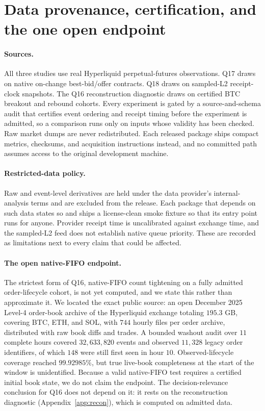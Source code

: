 \section{Data provenance, certification, and the one open endpoint}
\label{app:data}

\paragraph{Sources.} All three studies use real Hyperliquid perpetual-futures observations.
Q17 draws on native on-change best-bid/offer contracts. Q18 draws on sampled-L2 receipt-clock
snapshots. The Q16 reconstruction diagnostic draws on certified BTC breakout and rebound
cohorts. Every experiment is gated by a source-and-schema audit that certifies event ordering
and receipt timing before the experiment is admitted, so a comparison runs only on inputs
whose validity has been checked. Raw market dumps are never redistributed. Each released
package ships compact metrics, checksums, and acquisition instructions instead, and no
committed path assumes access to the original development machine.

\paragraph{Restricted-data policy.} Raw and event-level derivatives are held under the data
provider's internal-analysis terms and are excluded from the release. Each package that
depends on such data states so and ships a license-clean smoke fixture so that its entry
point runs for anyone. Provider receipt time is uncalibrated against exchange time, and the
sampled-L2 feed does not establish native queue priority. These are recorded as limitations
next to every claim that could be affected.

\paragraph{The open native-FIFO endpoint.} The strictest form of Q16, native-FIFO count
tightening on a fully admitted order-lifecycle cohort, is not yet computed, and we state
this rather than approximate it. We located the exact public source: an open December 2025
Level-4 order-book archive of the Hyperliquid exchange totaling $195.3$ GB, covering BTC,
ETH, and SOL, with $744$ hourly files per order archive, distributed with raw book diffs and
trades. A bounded washout audit over $11$ complete hours covered $32{,}633{,}820$ events and
observed $11{,}328$ legacy order identifiers, of which $148$ were still first seen in hour
$10$. Observed-lifecycle coverage reached $99.92985\%$, but true live-book completeness at the
start of the window is unidentified. Because a valid native-FIFO test requires a certified
initial book state, we do not claim the endpoint. The decision-relevance conclusion for Q16
does not depend on it: it rests on the reconstruction diagnostic (Appendix~\ref{app:recon}),
which is computed on admitted data.


